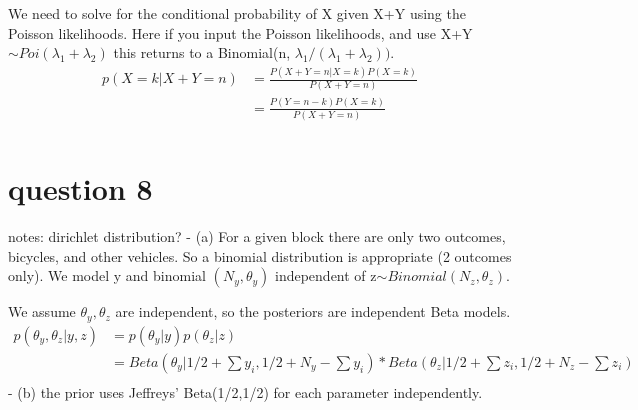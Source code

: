 \documentclass[
]{book}
\theoremstyle{definition}
\theoremstyle{definition}
\theoremstyle{definition}
\theoremstyle{definition}
\theoremstyle{remark}
\begin{document}
We need to solve for the conditional probability of X given X+Y using the Poisson likelihoods. Here if you input the Poisson likelihoods, and use X+Y \(\sim Poi(\lambda_1+\lambda_2)\) this returns to a Binomial(n, \(\lambda_1/(\lambda_1+\lambda_2))\).
\[
\begin{aligned}
p(X =k| X+Y=n) &= \frac{P(X+Y=n | X=k)P(X=k)}{P(X+Y=n)} \\
 &=  \frac{P(Y=n-k)P(X=k)}{P(X+Y=n)} \\
\end{aligned}
\]

\hypertarget{question-8}{%
\section*{question 8}\label{question-8}}

notes: dirichlet distribution?
- (a) For a given block there are only two outcomes, bicycles, and other vehicles. So a binomial distribution is appropriate (2 outcomes only). We model y and binomial \((N_y,\theta_y)\) independent of z\(\sim Binomial(N_z,\theta_z)\).

We assume \(\theta_y,\theta_z\) are independent, so the posteriors are independent Beta models.
\[
\begin{aligned}
p(\theta_y,\theta_z| y,z) &= p(\theta_y | y)p(\theta_z|z) \\
&= Beta(\theta_y  | 1/2 +\sum y_i, 1/2+N_y-\sum y_i)*Beta(\theta_z  | 1/2 +\sum z_i, 1/2+N_z-\sum z_i)\\
\end{aligned}
\]
- (b) the prior uses Jeffreys' Beta(1/2,1/2) for each parameter independently.
\end{document}
